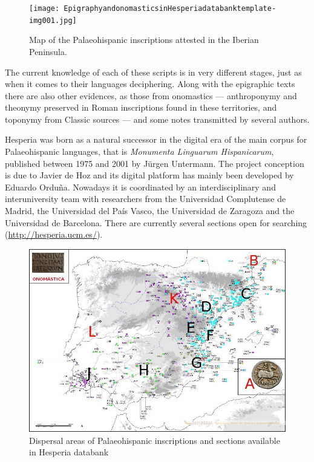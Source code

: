 \documentclass[amsthm,ebook]{saparticle}
\begin{document}
\begin{figure}[!hbp]
\centering
 \texttt{[image: EpigraphyandonomasticsinHesperiadatabanktemplate-img001.jpg]}
\caption{ Map of the Palaeohispanic inscriptions attested in the Iberian Peninsula.}
\label{fig:1}
\end{figure}


The current knowledge of each of these scripts is in very different stages, just as when it comes to their languages
deciphering. Along with the epigraphic texts there are also other evidences, as those from onomastics --- anthroponymy
and theonymy preserved in Roman inscriptions found in these territories, and toponymy from Classic sources --- and some
notes transmitted by several authors. 

Hesperia was born as a natural successor in the digital era of the main corpus for Palaeohispanic languages, that is
\emph{Monumenta Linguarum Hispanicarum}, published between 1975 and 2001 by Jürgen Untermann. The project conception is due to
Javier de Hoz and its digital platform has mainly been developed by Eduardo Orduña. Nowadays it is coordinated by an
interdisciplinary and interuniversity team with researchers from the Universidad Complutense de Madrid, the Universidad
del País Vasco, the Universidad de Zaragoza and the Universidad de Barcelona. There are currently several sections open
for searching (\url{http://hesperia.ucm.es/}).

\begin{figure}[!hbp]
\centering
 \includegraphics[width=\columnwidth]{EpigraphyandonomasticsinHesperiadatabanktemplate-img002.png}
\caption{Dispersal areas of Palaeohispanic inscriptions and sections available in Hesperia databank}
\label{fig:2}
\end{figure}
\end{document}
